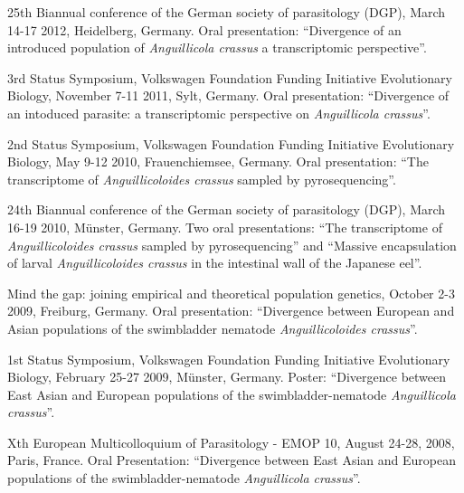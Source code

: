 \documentclass[10pt,a4paper]{article}
\renewenvironment{itemize}{
  \begin{list}{}{
    \setlength{\leftmargin}{2.5em}
    \setlength{\itemsep}{0.25em}
    \setlength{\parskip}{0pt}
    \setlength{\parsep}{0.25em}
  }
}{
  \end{list}
}
\begin{document}
\begin{itemize}

\item 25th Biannual conference of the German society of parasitology
  (DGP), March 14-17 2012, Heidelberg, Germany. Oral presentation:
  ``Divergence of an introduced population of \textit{Anguillicola
    crassus} a transcriptomic perspective''.

\item 3rd Status Symposium, Volkswagen Foundation Funding Initiative
  Evolutionary Biology, November 7-11 2011, Sylt, Germany. Oral
  presentation: ``Divergence of an intoduced parasite: a
  transcriptomic perspective on \textit{Anguillicola crassus}''.

\item 2nd Status Symposium, Volkswagen Foundation Funding Initiative
  Evolutionary Biology, May 9-12 2010, Frauenchiemsee, Germany. Oral
  presentation: ``The transcriptome of \textit{Anguillicoloides
    crassus} sampled by pyrosequencing''.

\item 24th Biannual conference of the German society of parasitology
  (DGP), March 16-19 2010, M\"unster, Germany. Two oral presentations:
  ``The transcriptome of \textit{Anguillicoloides crassus} sampled by
  pyrosequencing'' and ``Massive encapsulation of larval
  \textit{Anguillicoloides crassus} in the intestinal wall of the
  Japanese eel''.

\item Mind the gap: joining empirical and theoretical population
  genetics, October 2-3 2009, Freiburg, Germany. Oral presentation:
  ``Divergence between European and Asian populations of the
  swimbladder nematode \textit{Anguillicoloides crassus}''.

\item 1st Status Symposium, Volkswagen Foundation Funding Initiative
  Evolutionary Biology, February 25-27 2009, M\"unster,
  Germany. Poster: ``Divergence between East Asian and European
  populations of the swimbladder-nematode \textit{Anguillicola
    crassus}''.

\item Xth European Multicolloquium of Parasitology - EMOP 10, August
  24-28, 2008, Paris, France. Oral Presentation: ``Divergence between
  East Asian and European populations of the swimbladder-nematode
  \textit{Anguillicola crassus}''.

\end{itemize}
\end{document}
